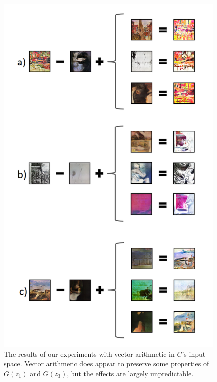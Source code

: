 \documentclass[10pt,twocolumn,letterpaper]{article}
\begin{document}
\begin{figure}[t]
	\begin{center}
		\includegraphics[width=0.9\linewidth]{arith_figure.png}
	\end{center}
	\caption{The results of our experiments with vector arithmetic in $ G $'s input space. Vector arithmetic does appear to preserve some properties of $ G(z_1) $ and $ G(z_3) $, but the effects are largely unpredictable.}
	\label{fig:long}
	\label{fig:onecol}
\end{figure}
\end{document}
